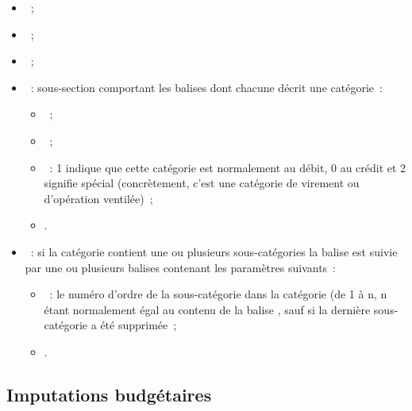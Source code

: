 \begin{itemize}

\item {}~;

\item {}~;

\item {}~;

\item {}~: sous-section comportant les 
balises  dont chacune décrit une  catégorie~:

\begin{itemize}

\item {}~;

\item {}~;

\item {}~: 1 indique que cette catégorie est normalement au débit, 0 
au crédit et 2 signifie spécial (concrètement, c'est une catégorie de virement 
ou d'opération ventilée)~;

\item {}.

\end{itemize}

\item {}~: si la catégorie contient une ou 
plusieurs sous-catégories la balise  est suivie par une ou
plusieurs balises  contenant les paramètres suivants~:

\begin{itemize}

\item {}~: le numéro d'ordre de la sous-catégorie dans la catégorie (de
1 à n, n étant normalement égal au contenu de la balise 
, sauf si la dernière sous-catégorie a été 
supprimée~;

\item {}.

\end{itemize}

\end{itemize}

\subsection{Imputations budgétaires\label{xml-budgetlines} }

